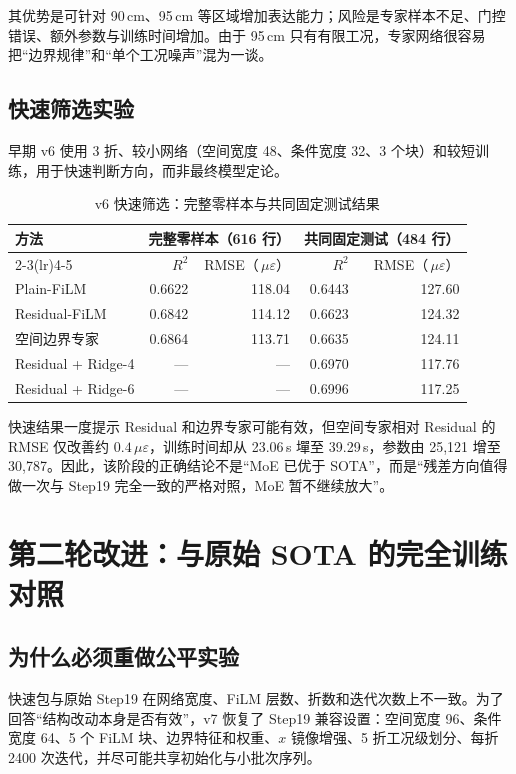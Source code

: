 \documentclass[11pt,a4paper]{article}
\newcommand{\ue}{\,\mu\varepsilon}
\begin{document}
其优势是可针对 90\,cm、95\,cm 等区域增加表达能力；风险是专家样本不足、门控错误、额外参数与训练时间增加。由于 95\,cm 只有有限工况，专家网络很容易把“边界规律”和“单个工况噪声”混为一谈。

\subsection{快速筛选实验}

早期 v6 使用 3 折、较小网络（空间宽度 48、条件宽度 32、3 个块）和较短训练，用于快速判断方向，而非最终模型定论。

\begin{table}[H]
\centering
\caption{v6 快速筛选：完整零样本与共同固定测试结果}
\label{tab:quick}
\small
\begin{tabular}{lrrrr}
\toprule
\multirow{2}{*}{方法} &
\multicolumn{2}{c}{完整零样本（616 行）} &
\multicolumn{2}{c}{共同固定测试（484 行）}\\
\cmidrule(lr){2-3}\cmidrule(lr){4-5}
 & $R^2$ & RMSE（$\ue$） & $R^2$ & RMSE（$\ue$）\\
\midrule
Plain-FiLM & 0.6622 & 118.04 & 0.6443 & 127.60\\
Residual-FiLM & 0.6842 & 114.12 & 0.6623 & 124.32\\
空间边界专家 & 0.6864 & 113.71 & 0.6635 & 124.11\\
Residual + Ridge-4 & --- & --- & 0.6970 & 117.76\\
Residual + Ridge-6 & --- & --- & 0.6996 & 117.25\\
\bottomrule
\end{tabular}
\end{table}

快速结果一度提示 Residual 和边界专家可能有效，但空间专家相对 Residual 的 RMSE 仅改善约 $0.4\ue$，训练时间却从 23.06\,s 墠至 39.29\,s，参数由 25,121 增至 30,787。因此，该阶段的正确结论不是“MoE 已优于 SOTA”，而是“残差方向值得做一次与 Step19 完全一致的严格对照，MoE 暂不继续放大”。

\section{第二轮改进：与原始 SOTA 的完全训练对照}

\subsection{为什么必须重做公平实验}

快速包与原始 Step19 在网络宽度、FiLM 层数、折数和迭代次数上不一致。为了回答“结构改动本身是否有效”，v7 恢复了 Step19 兼容设置：空间宽度 96、条件宽度 64、5 个 FiLM 块、边界特征和权重、$x$ 镜像增强、5 折工况级划分、每折 2400 次迭代，并尽可能共享初始化与小批次序列。
\end{document}
